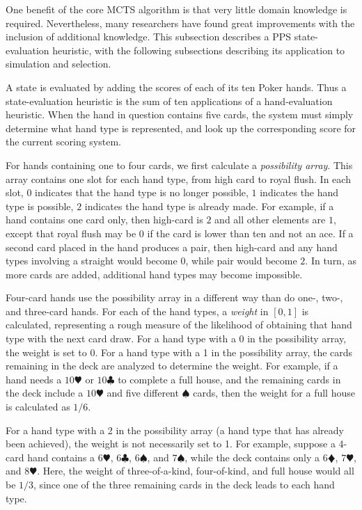 \documentclass[letterpaper]{article}
\begin{document}
One benefit of the core MCTS algorithm is that very little domain knowledge is required. Nevertheless, many researchers have found great improvements with the inclusion of additional knowledge. This subsection describes a PPS state-evaluation heuristic, with the following subsections describing its application to simulation and selection.

A state is evaluated by adding the scores of each of its ten Poker hands. Thus a state-evaluation heuristic is the sum of ten applications of a hand-evaluation heuristic. When the hand in question contains five cards, the system must simply determine what hand type is represented, and look up the corresponding score for the current scoring system.

For hands containing one to four cards, we first calculate a {\it possibility array}. This array contains one slot for each hand type, from high card to royal flush. In each slot, $0$ indicates that the hand type is no longer possible, $1$ indicates the hand type is possible, $2$ indicates the hand type is already made. For example, if a hand contains one card only, then high-card is $2$ and all other elements are $1$, except that royal flush may be $0$ if the card is lower than ten and not an ace. If a second card placed in the hand produces a pair, then high-card and any hand types involving a straight would become $0$, while pair would become $2$. In turn, as more cards are added, additional hand types may become impossible.

Four-card hands use the possibility array in a different way than do one-, two-, and three-card hands. For each of the hand types, a {\it weight} in $[0,1]$ is calculated, representing a rough measure of the likelihood of obtaining that hand type with the next card draw. For a hand type with a 0 in the possibility array, the weight is set to 0. For a hand type with a 1 in the possibility array, the cards remaining in the deck are analyzed to determine the weight. For example, if a hand needs a $10\varheartsuit$ or $10\clubsuit$ to complete a full house, and the remaining cards in the deck include a $10\varheartsuit$ and five different $\spadesuit$ cards, then the weight for a full house is calculated as $1 / 6$. 

For a hand type with a 2 in the possibility array (a hand type that has already been achieved), the weight is not necessarily set to 1. For example, suppose a 4-card hand contains a $6\varheartsuit$, $6\clubsuit$, $6\spadesuit$, and $7\spadesuit$, while the deck contains only a $6\vardiamondsuit$, $7\varheartsuit$, and $8\varheartsuit$. Here, the weight of three-of-a-kind, four-of-kind, and full house would all be $1/3$, since one of the three remaining cards in the deck leads to each hand type.
\end{document}
